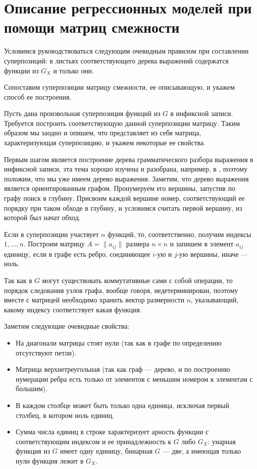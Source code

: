 \documentclass[12pt,a4paper]{amsart}
\begin{document}
\section{Описание регрессионных моделей при помощи матриц смежности}

Условимся руководствоваться следующим очевидным правилом при составлении суперпозиций: в листьях соответствующего
дерева выражений содержатся функции из $G_X$ и только они.

Сопоставим суперпозиции матрицу смежности, ее описывающую, и укажем способ ее построения.

Пусть дана произвольная суперпозиция функций из $G$ в инфиксной записи. Требуется построить соответствующую данной
суперпозиции матрицу. Таким образом мы заодно и опишем, что представляет из себя матрица, характеризующая суперпозицию,
и укажем некоторые ее свойства.

Первым шагом является построение дерева грамматического разбора выражения в инфиксной записи, эта тема хорошо изучена
и разобрана, например, в \cite{Aho86}, поэтому положим, что мы уже имеем дерево выражения. Заметим, что дерево
выражения является ориентированным графом. Пронумеруем его вершины, запустив по графу поиск в глубину. Присвоим каждой
вершине номер, соответствующий ее порядку при таком обходе в глубину, и условимся считать первой вершину, из которой
был начат обход.

Если в суперпозиции участвует $n$ функций, то, соответственно, получим индексы $1, \dots, n$. Построим матрицу
$A = \| a_{ij} \|$ размера $n \times n$ и запишем в элемент $a_{ij}$ единицу, если в графе есть ребро, соединяющее
$i$-ую и $j$-ую вершины, иначе --- ноль.

Так как в $G$ могут существовать коммутативные сами с собой операции, то порядок следования узлов графа, вообще говоря,
недетерминирован, поэтому вместе с матрицей необходимо хранить вектор размерности $n$, указывающий, какому индексу
соответствует какая функция.

Заметим следующие очевидные свойства:

\begin{itemize}
  \item На диагонали матрицы стоят нули (так как в графе по определению отсутствуют петли).
  \item Матрица верхнетреугольная (так как граф --- дерево, и по построению нумерации ребра есть только от элементов
	с меньшим номером к элементам с большим).
  \item В каждом столбце может быть только одна единица, исключая первый столбец, в котором ноль единиц.
  \item Сумма числа единиц в строке характеризует арность функции с соответствующим индексом и ее принадлежность к $G$
	либо $G_X$: унарная функция из $G$ имеет одну единицу, бинарная $G$ --- две, а имеющая только нули функция лежит в $G_X$.
\end{itemize}
\end{document}
